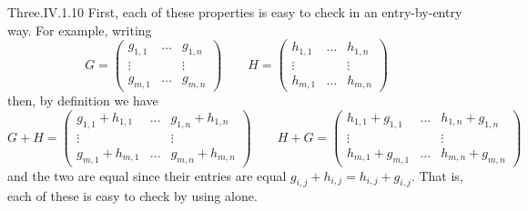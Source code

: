 \begin{ans}{Three.IV.1.10}
      First, each of these properties
      is easy to check in an entry-by-entry way.
      For example, writing
      \begin{equation*}
        G=
        \begin{pmatrix}
          g_{1,1}  &\ldots  &g_{1,n}  \\
          \vdots   &        &\vdots   \\
          g_{m,1}  &\ldots  &g_{m,n}
        \end{pmatrix}
        \qquad
        H=
        \begin{pmatrix}
          h_{1,1}  &\ldots  &h_{1,n}  \\
          \vdots   &        &\vdots   \\
          h_{m,1}  &\ldots  &h_{m,n}
        \end{pmatrix}
      \end{equation*}
      then, by definition we have
      \begin{equation*}
        G+H=
        \begin{pmatrix}
          g_{1,1}+h_{1,1}  &\ldots  &g_{1,n}+h_{1,n}  \\
          \vdots           &        &\vdots           \\
          g_{m,1}+h_{m,1}  &\ldots  &g_{m,n}+h_{m,n}
        \end{pmatrix}
        \qquad
        H+G=
        \begin{pmatrix}
          h_{1,1}+g_{1,1}  &\ldots  &h_{1,n}+g_{1,n}  \\
          \vdots           &        &\vdots           \\
          h_{m,1}+g_{m,1}  &\ldots  &h_{m,n}+g_{m,n}
        \end{pmatrix}
      \end{equation*}
      and the two are equal since their entries are equal
      $g_{i,j}+h_{i,j}=h_{i,j}+g_{i,j}$.
      That is, each of these is easy to check by using
       alone.


\end{ans}

